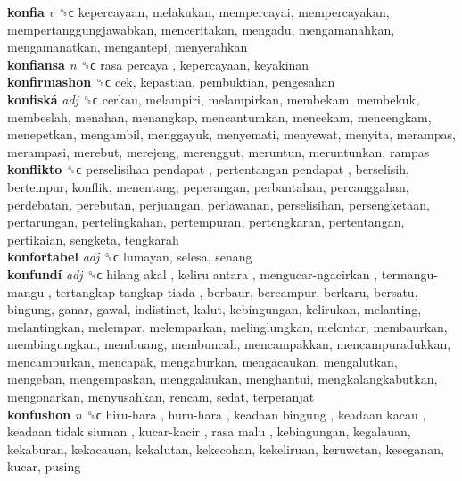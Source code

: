 \textbf{konfia} \emph{v}  ␝ϲ  kepercayaan, melakukan, mempercayai, mempercayakan, mempertanggungjawabkan, menceritakan, mengadu, mengamanahkan, mengamanatkan, mengantepi, menyerahkan  \\
\textbf{konfiansa} \emph{n}  ␝ϲ   rasa percaya , kepercayaan, keyakinan  \\
\textbf{konfirmashon} ␝ϲ  cek, kepastian, pembuktian, pengesahan  \\
\textbf{konfiská} \emph{adj}  ␝ϲ  cerkau, melampiri, melampirkan, membekam, membekuk, membeslah, menahan, menangkap, mencantumkan, mencekam, mencengkam, menepetkan, mengambil, menggayuk, menyemati, menyewat, menyita, merampas, merampasi, merebut, merejeng, merenggut, meruntun, meruntunkan, rampas  \\
\textbf{konflikto} ␝ϲ   perselisihan pendapat ,  pertentangan pendapat , berselisih, bertempur, konflik, menentang, peperangan, perbantahan, percanggahan, perdebatan, perebutan, perjuangan, perlawanan, perselisihan, persengketaan, pertarungan, pertelingkahan, pertempuran, pertengkaran, pertentangan, pertikaian, sengketa, tengkarah  \\
\textbf{konfortabel} \emph{adj}  ␝ϲ  lumayan, selesa, senang  \\
\textbf{konfundí} \emph{adj}  ␝ϲ   hilang akal ,  keliru antara ,  mengucar-ngacirkan ,  termangu-mangu ,  tertangkap-tangkap tiada , berbaur, bercampur, berkaru, bersatu, bingung, ganar, gawal, indistinct, kalut, kebingungan, kelirukan, melanting, melantingkan, melempar, melemparkan, melinglungkan, melontar, membaurkan, membingungkan, membuang, membuncah, mencampakkan, mencampuradukkan, mencampurkan, mencapak, mengaburkan, mengacaukan, mengalutkan, mengeban, mengempaskan, menggalaukan, menghantui, mengkalangkabutkan, mengonarkan, menyusahkan, rencam, sedat, terperanjat  \\
\textbf{konfushon} \emph{n}  ␝ϲ   hiru-hara ,  huru-hara ,  keadaan bingung ,  keadaan kacau ,  keadaan tidak siuman ,  kucar-kacir ,  rasa malu , kebingungan, kegalauan, kekaburan, kekacauan, kekalutan, kekecohan, kekeliruan, keruwetan, keseganan, kucar, pusing  \\
